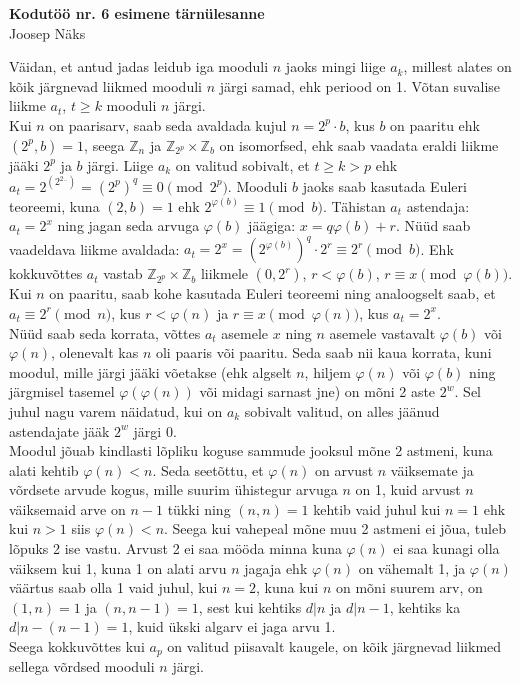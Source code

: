 \documentclass[a4paper, 10pt]{article}
\newcommand{\Z}{\mathbb{Z}}
\begin{document}
\begin{center}
\Large\textbf{Kodutöö nr. 6 esimene tärnülesanne}\\
\small{Joosep Näks}
\end{center}
Väidan, et antud jadas leidub iga mooduli $n$ jaoks mingi liige $a_k$, millest alates on kõik järgnevad liikmed mooduli $n$ järgi samad, ehk periood on 1. Võtan suvalise liikme $a_t$, $t\geq k$ mooduli $n$ järgi.\\
\indent Kui $n$ on paarisarv, saab seda avaldada kujul $n=2^p\cdot b$, kus $b$ on paaritu ehk $(2^p,b)=1$, seega $\Z_n$ ja $\Z_{2^p}\times\Z_b$ on isomorfsed, ehk saab vaadata eraldi liikme jääki $2^p$ ja $b$ järgi. Liige $a_k$ on valitud sobivalt, et $t\geq k>p$ ehk $a_t=2^{(2^{2..})}=(2^p)^q\equiv0\pmod{2^p}$. Mooduli $b$ jaoks saab kasutada Euleri teoreemi, kuna $(2,b)=1$ ehk $2^{\varphi(b)}\equiv1\pmod b$. Tähistan $a_t$ astendaja: $a_t=2^x$ ning jagan seda arvuga $\varphi(b)$ jäägiga: $x=q\varphi(b)+r$. Nüüd saab vaadeldava liikme avaldada: $a_t=2^x=(2^{\varphi(b)})^q\cdot 2^r\equiv2^r\pmod b$. Ehk kokkuvõttes $a_t$ vastab $\Z_{2^p}\times\Z_b$ liikmele $(0,2^r)$, $r<\varphi(b)$, $r\equiv x\pmod{\varphi(b)}$.\\
\indent Kui $n$ on paaritu, saab kohe kasutada Euleri teoreemi ning analoogselt saab, et $a_t\equiv2^r\pmod n$, kus $r<\varphi(n)$ ja $r\equiv x\pmod{\varphi(n)}$, kus $a_t=2^x$.\\
\indent Nüüd saab seda korrata, võttes $a_t$ asemele $x$ ning $n$ asemele vastavalt $\varphi(b)$ või $\varphi(n)$, olenevalt kas $n$ oli paaris või paaritu. Seda saab nii kaua korrata, kuni moodul, mille järgi jääki võetakse (ehk algselt $n$, hiljem $\varphi(n)$ või $\varphi(b)$ ning järgmisel tasemel $\varphi(\varphi(n))$ või midagi sarnast jne) on mõni 2 aste $2^w$. Sel juhul nagu varem näidatud, kui on $a_k$ sobivalt valitud, on alles jäänud astendajate jääk $2^w$ järgi 0.\\
Moodul jõuab kindlasti lõpliku koguse sammude jooksul mõne 2 astmeni, kuna alati kehtib $\varphi(n)<n$. Seda seetõttu, et $\varphi(n)$ on arvust $n$ väiksemate ja võrdsete arvude kogus, mille suurim ühistegur arvuga $n$ on 1, kuid arvust $n$ väiksemaid arve on $n-1$ tükki ning $(n,n)=1$ kehtib vaid juhul kui $n=1$ ehk kui $n>1$ siis $\varphi(n)<n$. Seega kui vahepeal mõne muu 2 astmeni ei jõua, tuleb lõpuks 2 ise vastu. Arvust 2 ei saa mööda minna kuna $\varphi(n)$ ei saa kunagi olla väiksem kui 1, kuna 1 on alati arvu $n$ jagaja ehk $\varphi(n)$ on vähemalt 1, ja $\varphi(n)$ väärtus saab olla 1 vaid juhul, kui $n=2$, kuna kui $n$ on mõni suurem arv, on $(1,n)=1$ ja $(n,n-1)=1$, sest kui kehtiks $d|n$ ja $d|n-1$, kehtiks ka $d|n-(n-1)=1$, kuid ükski algarv ei jaga arvu 1.\\
\indent Seega kokkuvõttes kui $a_p$ on valitud piisavalt kaugele, on kõik järgnevad liikmed sellega võrdsed mooduli $n$ järgi.
\end{document}
